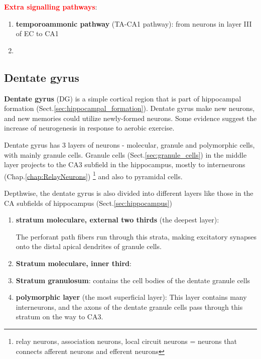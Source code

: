 \textcolor{red}{\bf Extra signalling pathways}:
\begin{enumerate}
  
  \item {\bf temporoammonic pathway} (TA-CA1 pathway): from neurons in layer III
  of EC to CA1
  
  \item 
  
\end{enumerate}

\subsection{Dentate gyrus}
\label{sec:dentate_gyrus}

{\bf Dentate gyrus} (DG) is a simple cortical region that is part of hippocampal
formation (Sect.\ref{sec:hippocampal_formation}).
Dentate gyrus make new neurons, and new memories could utilize newly-formed
neurons. Some evidence suggest the increase of neurogenesis in response to
aerobic exercise. 

Dentate gyrus has 3 layers of neurons - molecular, granule and polymorphic
cells, with mainly granule cells. Granule cells (Sect.\ref{sec:granule_cells})
in the middle layer projects to the CA3 subfield in the hippocampus, mostly to
interneurons (Chap.\ref{chap:RelayNeurons}) \footnote{relay neurons, association
neurons, local circuit neurons = neurons that connects afferent neurons and
efferent neurons} and also to pyramidal cells.

Depthwise, the dentate gyrus is also divided into different layers like those 
in the CA subfields of hippocampus (Sect.\ref{sec:hippocampus})
\begin{enumerate}
  \item {\bf stratum moleculare, external two thirds} (the deepest layer): 
  
The perforant path fibers run through this strata, making excitatory synapses
onto the distal apical dendrites of granule cells.

  \item {\bf Stratum moleculare, inner third}:  
  
  \item {\bf Stratum granulosum}: contains the cell bodies of the dentate
  granule cells
  
  \item {\bf polymorphic layer} (the most superficial layer):
  This layer contains many interneurons, and the axons of the dentate granule
  cells pass through this stratum on the way to CA3.
\end{enumerate}

